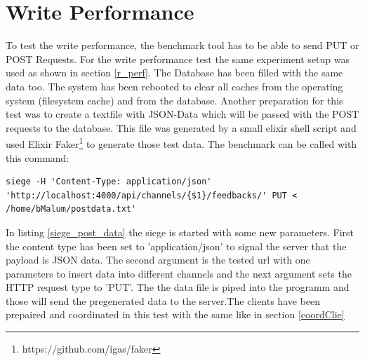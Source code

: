 \section{Write Performance}\label{w_perf}
{\color{newcode} To test the write performance, the benchmark tool has to be able to send PUT or POST Requests. For the write performance test the same experiment setup was used as shown in section \ref{r_perf}. The Database has been filled with the same data too. The system has been rebooted to clear all caches from the operating system (filesystem cache) and from the database.
Another preparation for this test was to create a textfile with JSON-Data which will be passed with the POST requests to the database. This file was generated by a small elixir shell script and used Elixir Faker\footnote{https://github.com/igas/faker} to generate those test data.
The benchmark can be called with this command:
\begin{lstlisting}[caption=Siege Post Data, label=siege_post_data]
siege -H 'Content-Type: application/json' 'http://localhost:4000/api/channels/{$1}/feedbacks/' PUT < /home/bMalum/postdata.txt' 
\end{lstlisting}
In listing \ref{siege_post_data} the siege is started with some new parameters. First the content type has been set to 'application/json' to signal the server that the payload is JSON data. The second argument is the tested url with one parameters to insert data into different channels and the next argument sets the HTTP request type to 'PUT'. The the data file is piped into the programm and those will send the pregenerated data to the server.The clients have been prepaired and coordinated in this test with the same like in section \ref{coordClie} }
